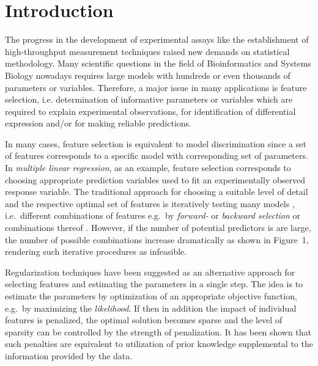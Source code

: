 \documentclass{bioinfo}
\begin{document}
\maketitle

\section{Introduction}
The progress in the development of experimental assays like the establishment of high-throughput measurement techniques raised new demands on statistical methodology. 
Many scientific questions in the field of Bioinformatics and Systems Biology nowadays requires large models with hundreds or even thousands of parameters or variables. 
Therefore, a major issue in many applications is feature selection, i.e. determination of informative parameters or variables which are required to explain experimental observations, for identification of differential expression and/or for making reliable predictions. 

In many cases, feature selection is equivalent to model discrimination \citep{Box67} since a set of features corresponds to a specific model with corresponding set of parameters. 
In \emph{multiple linear regression}, as an example, feature selection corresponds to choosing appropriate prediction variables used to fit an experimentally observed response variable. 
The traditional approach for choosing a suitable level of detail and the respective optimal set of features is iteratively testing many models \citep{Thompson1978}, 
i.e.~different combinations of features e.g.~by \emph{forward-} or \emph{backward selection} or combinations thereof \citep{Hocking1967, Efroymson60}. 
However, if the number of potential predictors is are large, the number of possible combinations increase dramatically as shown in Figure~1\vphantom{\ref{fig:01}}, rendering such iterative procedures as infeasible. 

Regularization techniques have been suggested as an alternative approach for selecting features and estimating the parameters in a single step. 
The idea is to estimate the parameters by optimization of an appropriate objective function, e.g.~by maximizing the \emph{likelihood}. 
If then in addition the impact of individual features is penalized, the optimal solution becomes sparse and the level of sparsity can be controlled by the strength of penalization. 
It has been shown that such penalties are equivalent to utilization of prior knowledge supplemental to the information provided by the data. 
\end{document}
